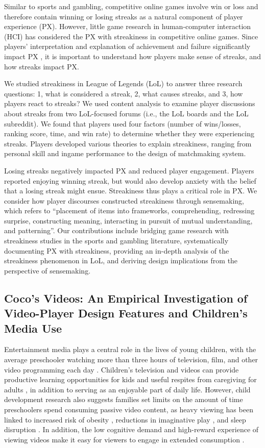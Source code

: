 Similar to sports and gambling, competitive online games
involve win or loss and therefore contain winning or losing
streaks as a natural component of player experience (PX).
However, little game research in human-computer
interaction (HCI) has considered the PX with streakiness in
competitive online games. Since players’ interpretation and
explanation of achievement and failure significantly impact
PX , it is important to understand how players make
sense of streaks, and how streaks impact PX.


We studied streakiness in League of Legends (LoL) to
answer three research questions: 1, what is considered a
streak, 2, what causes streaks, and 3, how players react to
streaks? We used content analysis to examine player
discussions about streaks from two LoL-focused forums
(i.e., the LoL boards and the LoL subreddit). We found that
players used four factors (number of wins/losses, ranking
score, time, and win rate) to determine whether they were
experiencing streaks. Players developed various theories to
explain streakiness, ranging from personal skill and ingame
performance to the design of matchmaking system.


Losing streaks negatively impacted PX and reduced player
engagement. Players reported enjoying winning streak, but
would also develop anxiety with the belief that a losing
streak might ensue. Streakiness thus plays a critical role in
PX. We consider how player discourses constructed
streakiness through sensemaking, which refers to
“placement of items into frameworks, comprehending,
redressing surprise, constructing meaning, interacting in
pursuit of mutual understanding, and patterning”. Our
contributions include bridging game research with
streakiness studies in the sports and gambling literature,
systematically documenting PX with streakiness, providing
an in-depth analysis of the streakiness phenomenon in LoL,
and deriving design implications from the perspective of
sensemaking. 


\subsection{Coco’s Videos: An Empirical Investigation of Video-Player
Design Features and Children's Media Use }

Entertainment media plays a central role in the lives of young
children, with the average preschooler watching more than
three hours of television, film, and other video programming
each day . Children’s television and videos can provide productive learning opportunities for kids  and useful respites from caregiving for adults , in addition to
serving as an enjoyable part of daily life. However, child development research also suggests families set limits on the
amount of time preschoolers spend consuming passive video
content, as heavy viewing has been linked to increased risk
of obesity , reductions in imaginative play , and sleep
disruption . In addition, the low cognitive demand and
high-reward experience of viewing videos make it easy for
viewers to engage in extended consumption .


